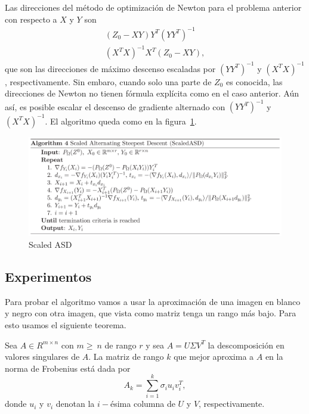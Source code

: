 Las direcciones del método de optimización de Newton para el problema anterior con respecto a $X$ y $Y$ son
\begin{align*}
    (Z_0 - XY) Y^T (Y Y^T)^{-1} \\
    (X^T X)^{-1} X^T (Z_0 - XY),
\end{align*}
que son las direcciones de máximo descenso escaladas por $(Y Y^T)^{-1}$ y $(X^T X)^{-1}$, respectivamente. Sin embaro, cuando solo una parte de $Z_0$ es conocida, las direcciones de Newton no tienen fórmula explícita como en el caso anterior. Aún así, es posible escalar el descenso de gradiente alternado con $(Y Y^T)^{-1}$ y $(X^T X)^{-1}$. El algoritmo queda como en la figura~\ref{fig:sASD}.

\begin{figure}[htbp]
    \centering
    \includegraphics[width=1.0\linewidth]{./Images/sASD_algorithm.PNG}
    \caption{Scaled ASD}\label{fig:sASD}
\end{figure}

\subsection{Experimentos}
Para probar el algoritmo vamos a usar la aproximación de una imagen en blanco y negro con otra imagen, que vista como matriz tenga un rango más bajo. Para esto usamos el siguiente teorema.

\begin{teorema}
    Sea $A \in R^{m \times n}$ con $m\geq~n$ de rango $r$ y sea $A = U \Sigma V^T$ la descomposición en valores singulares de $A$. La matriz de rango $k$ que mejor aproxima a $A$ en la norma de Frobenius está dada por
    \begin{equation*}
        A_k = \sum_{i=1}^{k} \sigma_i u_i v_i^T,
    \end{equation*}
    donde $u_i$ y $v_i$ denotan la $i-$ésima columna de $U$ y $V$, respectivamente.
\end{teorema}

